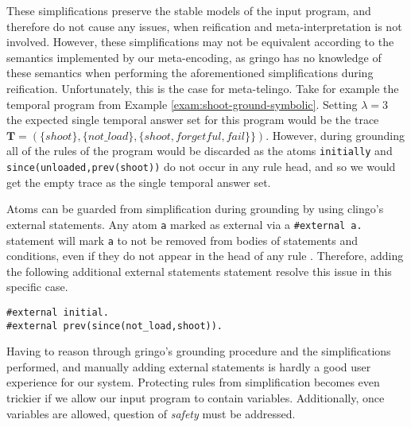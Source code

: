 These simplifications preserve the stable models of the input program,
and therefore do not cause any issues, when reification and
meta-interpretation is not involved. However, these simplifications
may not be equivalent according to the semantics implemented by our
meta-encoding, as gringo has no knowledge of these semantics when
performing the aforementioned simplifications during
reification. Unfortunately, this is the case for meta-telingo. Take
for example the temporal program from Example
\ref{exam:shoot-ground-symbolic}. Setting $\lambda=3$ the expected
single temporal answer set for this program would be the trace
$\bm{T}=(\{ shoot \}, \{ not\_load \}, \{ shoot, forgetful, fail \}
\})$. However, during grounding all of the rules of the program would
be discarded as the atoms \verb|initially| and
\verb|since(unloaded,prev(shoot))| do not occur in any rule head, and
so we would get the empty trace as the single temporal answer set.

Atoms can be guarded from simplification during grounding by using
clingo's external statements. Any atom \verb|a| marked as external via
a \verb|#external a.| statement will mark \verb|a| to not be removed
from bodies of statements and conditions, even if they do not appear
in the head of any rule \cite{PotasscoUserGuide19}. Therefore, adding
the following additional external statements statement resolve this
issue in this specific case.

\begin{lstlisting}[language=clingo,numbers=none]
#external initial.
#external prev(since(not_load,shoot)).
\end{lstlisting}

Having to reason through gringo's grounding procedure and the
simplifications performed, and manually adding external statements is
hardly a good user experience for our system. Protecting rules from
simplification becomes even trickier if we allow our input program to
contain variables. Additionally, once variables are allowed, question
of \emph{safety} must be addressed.

